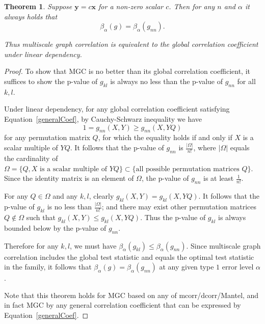 \documentclass[11pt]{article}
\providecommand{\mb}[1]{\boldsymbol{#1}}
\newtheorem{thm}{Theorem}
\begin{document}
\begin{thm}
Suppose $\mb{y}=c\mb{x}$ for a non-zero scalar $c$. Then for any $n$ and $\alpha$ it always holds that
\begin{equation}
\beta_{\alpha}(g) = \beta_{\alpha}(g_{nn}).
\end{equation}

Thus multiscale graph correlation is equivalent to the global correlation coefficient under linear dependency.
\end{thm}
\begin{proof}
To show that MGC is no better than its global correlation coefficient, it suffices to show the p-value of $g_{kl}$ is always no less than the p-value of $g_{nn}$ for all $k,l$.


Under linear dependency, for any global correlation coefficient satisfying Equation~\ref{generalCoef}, by Cauchy-Schwarz inequality we have
\begin{equation}
1=g_{nn}(X, Y) \geq g_{nn}(X, YQ)
\end{equation}
for any permutation matrix $Q$, for which the equality holds if and only if $X$ is a scalar multiple of $YQ$. It follows that the p-value of $g_{nn}$ is $\frac{|\Omega|}{n!}$, where $|\Omega|$ equals the cardinality of $\Omega=\{Q, X \mbox{ is a scalar multiple of }YQ\} \subset \{\mbox{all possible permutation matrices }Q\}$. Since the identity matrix is an element of $\Omega$, the p-value of $g_{nn}$ is at least $\frac{1}{n!}$.

For any $Q \in \Omega$ and any $k,l$, clearly $g_{kl}(X,Y)=g_{kl}(X,YQ)$. It follows that the p-value of $g_{kl}$ is no less than $\frac{|\Omega|}{n!}$; and there may exist other permutation matrices $Q \notin \Omega$ such that $g_{kl}(X,Y) \leq g_{kl}(X,YQ)$. Thus the p-value of $g_{kl}$ is always bounded below by the p-value of $g_{nn}$.

Therefore for any $k,l$, we must have $\beta_{\alpha}(g_{kl}) \leq \beta_{\alpha}(g_{nn})$. Since multiscale graph correlation includes the global test statistic and equals the optimal test statistic in the family, it follows that $\beta_{\alpha}(g) = \beta_{\alpha}(g_{nn})$ at any given type $1$ error level $\alpha$.

Note that this theorem holds for MGC based on any of mcorr/dcorr/Mantel, and in fact MGC by any general correlation coefficient that can be expressed by Equation~\ref{generalCoef}.
\end{proof}
\end{document}
